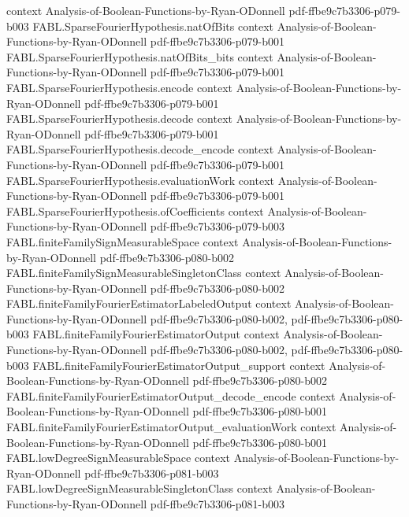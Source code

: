 \begin{theorem}
  {context}
  {Analysis-of-Boolean-Functions-by-Ryan-ODonnell}
  {pdf-ffbe9c7b3306-p079-b003}
\proofstep
  {FABL.SparseFourierHypothesis.natOfBits}
  {context}
  {Analysis-of-Boolean-Functions-by-Ryan-ODonnell}
  {pdf-ffbe9c7b3306-p079-b001}
\proofstep
  {FABL.SparseFourierHypothesis.natOfBits_bits}
  {context}
  {Analysis-of-Boolean-Functions-by-Ryan-ODonnell}
  {pdf-ffbe9c7b3306-p079-b001}
\proofstep
  {FABL.SparseFourierHypothesis.encode}
  {context}
  {Analysis-of-Boolean-Functions-by-Ryan-ODonnell}
  {pdf-ffbe9c7b3306-p079-b001}
\proofstep
  {FABL.SparseFourierHypothesis.decode}
  {context}
  {Analysis-of-Boolean-Functions-by-Ryan-ODonnell}
  {pdf-ffbe9c7b3306-p079-b001}
\proofstep
  {FABL.SparseFourierHypothesis.decode_encode}
  {context}
  {Analysis-of-Boolean-Functions-by-Ryan-ODonnell}
  {pdf-ffbe9c7b3306-p079-b001}
\proofstep
  {FABL.SparseFourierHypothesis.evaluationWork}
  {context}
  {Analysis-of-Boolean-Functions-by-Ryan-ODonnell}
  {pdf-ffbe9c7b3306-p079-b001}
\proofstep
  {FABL.SparseFourierHypothesis.ofCoefficients}
  {context}
  {Analysis-of-Boolean-Functions-by-Ryan-ODonnell}
  {pdf-ffbe9c7b3306-p079-b003}
\proofstep
  {FABL.finiteFamilySignMeasurableSpace}
  {context}
  {Analysis-of-Boolean-Functions-by-Ryan-ODonnell}
  {pdf-ffbe9c7b3306-p080-b002}
\proofstep
  {FABL.finiteFamilySignMeasurableSingletonClass}
  {context}
  {Analysis-of-Boolean-Functions-by-Ryan-ODonnell}
  {pdf-ffbe9c7b3306-p080-b002}
\proofstep
  {FABL.finiteFamilyFourierEstimatorLabeledOutput}
  {context}
  {Analysis-of-Boolean-Functions-by-Ryan-ODonnell}
  {pdf-ffbe9c7b3306-p080-b002,
    pdf-ffbe9c7b3306-p080-b003}
\proofstep
  {FABL.finiteFamilyFourierEstimatorOutput}
  {context}
  {Analysis-of-Boolean-Functions-by-Ryan-ODonnell}
  {pdf-ffbe9c7b3306-p080-b002,
    pdf-ffbe9c7b3306-p080-b003}
\proofstep
  {FABL.finiteFamilyFourierEstimatorOutput_support}
  {context}
  {Analysis-of-Boolean-Functions-by-Ryan-ODonnell}
  {pdf-ffbe9c7b3306-p080-b002}
\proofstep
  {FABL.finiteFamilyFourierEstimatorOutput_decode_encode}
  {context}
  {Analysis-of-Boolean-Functions-by-Ryan-ODonnell}
  {pdf-ffbe9c7b3306-p080-b001}
\proofstep
  {FABL.finiteFamilyFourierEstimatorOutput_evaluationWork}
  {context}
  {Analysis-of-Boolean-Functions-by-Ryan-ODonnell}
  {pdf-ffbe9c7b3306-p080-b001}
\proofstep
  {FABL.lowDegreeSignMeasurableSpace}
  {context}
  {Analysis-of-Boolean-Functions-by-Ryan-ODonnell}
  {pdf-ffbe9c7b3306-p081-b003}
\proofstep
  {FABL.lowDegreeSignMeasurableSingletonClass}
  {context}
  {Analysis-of-Boolean-Functions-by-Ryan-ODonnell}
  {pdf-ffbe9c7b3306-p081-b003}
\proofstep

\end{theorem}

